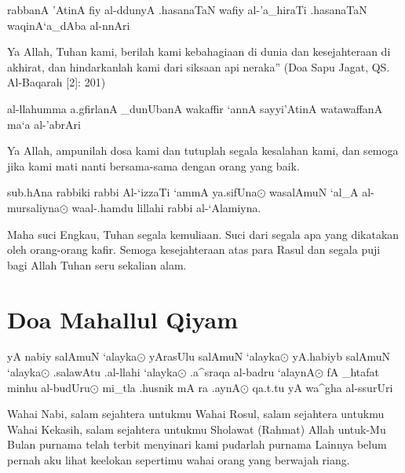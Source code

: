 \documentclass[a4paper,12pt,makeidx]{article}
\begin{document}
\vspace{0.5cm}
\begin{arabtext}
rabbanA 'AtinA fiy al-ddunyA .hasanaTaN wafiy al-'a_hiraTi 
.hasanaTaN waqinA`a_dAba al-nnAri
\end{arabtext}

\vspace{0.5cm}
Ya Allah, Tuhan kami, berilah kami kebahagiaan di dunia 
dan kesejahteraan di akhirat, dan hindarkanlah kami dari 
siksaan api neraka” (Doa Sapu Jagat, QS. Al-Baqarah [2]: 201)

\vspace{0.5cm}
\begin{arabtext}
al-llahumma a.gfirlanA _dunUbanA wakaffir `annA sayyi'AtinA watawaffanA ma`a al-'abrAri
\end{arabtext}

\vspace{0.5cm}
Ya Allah, ampunilah dosa kami dan tutuplah segala kesalahan kami, dan semoga jika kami mati nanti bersama-sama dengan orang yang baik.

\vspace{0.5cm}
\begin{arabtext}
sub.hAna rabbiki rabbi Al-`izzaTi `ammA ya.sifUna$\odot$
wasalAmuN `al_A al-mursaliyna$\odot$
waal-.hamdu lillahi rabbi al-`Alamiyna.
\end{arabtext}

\vspace{0.5cm}
Maha suci Engkau, Tuhan segala kemuliaan. Suci dari segala apa yang dikatakan oleh orang-orang kafir. Semoga kesejahteraan atas para Rasul dan segala puji bagi Allah Tuhan seru sekalian alam.


\vspace{0.5cm}
\section{Doa Mahallul Qiyam}
\begin{arabtext}
yA nabiy salAmuN `alayka$\odot$
yArasUlu salAmuN `alayka$\odot$
yA.habiyb salAmuN `alayka$\odot$
.salawAtu .al-llahi `alayka$\odot$
.a^sraqa al-badru `alaynA$\odot$
fA _htafat minhu al-budUru$\odot$
mi_tla .husnik mA ra .aynA$\odot$
qa.t.tu yA wa^gha al-ssurUri
\end{arabtext}

\vspace{0.5cm}
Wahai Nabi, salam sejahtera untukmu
Wahai Rosul, salam sejahtera untukmu
Wahai Kekasih, salam sejahtera untukmu
Sholawat (Rahmat) Allah untuk-Mu
Bulan purnama telah terbit menyinari kami
pudarlah purnama Lainnya
belum pernah aku lihat keelokan sepertimu
wahai orang yang berwajah riang.
\end{document}
